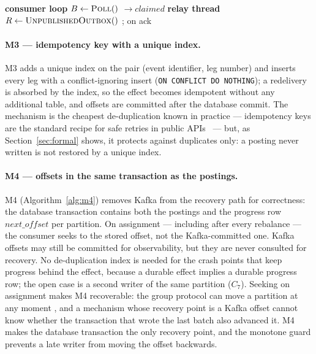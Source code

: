 \begin{algorithm}[t]
\footnotesize
\begin{algorithmic}[1]
\State \textbf{consumer loop}
\Loop
  \State $B \gets \Call{Poll}{ }$
  \State {}
    \State {} $\rightarrow \mathit{claimed}$ 
      \State {}
      \State {}
    \EndIf
  \EndFor
  \State {} 
  \State {}
\EndLoop
\Statex
\State \textbf{relay thread}
\Loop
  \State $R \gets \Call{UnpublishedOutbox}{ }$
    \State {}; on ack 
  \EndFor
\EndLoop
\end{algorithmic}
\caption{M2: transactional outbox with inbox claim and relay}
\label{alg:m2}
\end{algorithm}

\paragraph{M3 --- idempotency key with a unique index.}
M3 adds a unique index on the pair (event identifier, leg number) and inserts every leg with
a conflict-ignoring insert (\texttt{ON CONFLICT DO NOTHING}); a redelivery is absorbed by the
index, so the effect becomes idempotent without any additional table, and offsets are committed
after the database commit. The mechanism is the cheapest de-duplication known in practice ---
idempotency keys are the standard recipe for safe retries in public
APIs~\cite{stripe-idempotency} --- but, as Section~\ref{sec:formal} shows, it
protects against duplicates only: a posting never written is not restored by a unique index.

\paragraph{M4 --- offsets in the same transaction as the postings.}
M4 (Algorithm~\ref{alg:m4}) removes Kafka from the recovery path for correctness: the database
transaction contains both the postings and the progress row $\mathit{next\_offset}$ per
partition. On assignment --- including after every rebalance \cite{kip429} --- the consumer
seeks to the stored offset, not the Kafka-committed one. Kafka offsets may still be committed
for observability, but they are never consulted for recovery. No de-duplication index is
needed for the crash points that keep progress behind the effect, because a durable effect
implies a durable progress row; the open case is a second writer of the same partition
($C_7$). Seeking on assignment makes M4 recoverable: the group protocol can move a partition at any
moment \cite{kip429}, and a mechanism whose recovery point is a Kafka offset cannot know
whether the transaction that wrote the last batch also advanced it. M4 makes the database
transaction the only recovery point, and the monotone guard prevents a late writer from moving
the offset backwards.


